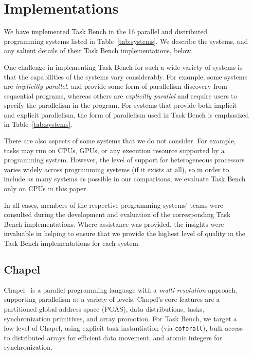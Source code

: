 \section{Implementations}
\label{sec:implementation}

We have implemented Task Bench in the 16 parallel and distributed
programming systems listed in Table~\ref{tab:systems}. We describe the
systems, and any salient details of their Task Bench implementations,
below.

One challenge in implementing Task Bench for such a wide variety of
systems is that the capabilities of the systems vary considerably. For
example, some systems are \emph{implicitly parallel}, and provide some
form of parallelism discovery from sequential programs, whereas others
are \emph{explicitly parallel} and require users to specify the
parallelism in the program. For systems that provide both implicit and explicit parallelism, the form of parallelism used in Task Bench is emphasized in Table~\ref{tab:systems}.


There are also aspects of some systems that we do not consider. For
example, tasks may run on CPUs, GPUs, or any execution resource
supported by a programming system. However, the level of support for
heterogeneous processors varies widely across programming systems (if it exists at all), so
in order to include as many systems as possible in our comparisons, we
evaluate Task Bench only on CPUs in this paper.

In all cases, members of the respective programming systems' teams
were consulted during the development and evaluation of the
corresponding Task Bench implementations. Where assistance was provided, the insights were invaluable
in helping to ensure that we provide the highest level of quality in the Task
Bench implementations for each system.



\subsection{Chapel}

Chapel~\cite{Chapel15} is a parallel programming language
with a \emph{multi-res\-o\-lu\-tion} approach, supporting parallelism at a variety of
levels. Chapel's core features are a partitioned global address space
(PGAS), data distributions, tasks,
synchronization primitives, and array promotion. For Task Bench, we target a low level of
Chapel, using explicit task instantiation (via
\lstinline[language=Chapel]{coforall}), bulk access to distributed
arrays for efficient data movement, and atomic integers for
synchronization.


